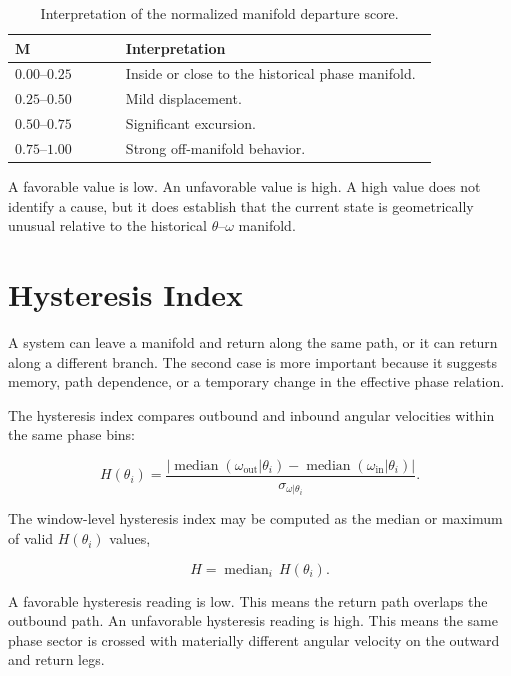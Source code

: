 \documentclass[11pt]{article}
\begin{document}
\begin{table}[H]
\centering
\caption{Interpretation of the normalized manifold departure score.}
\begin{tabular}{>{\raggedleft\arraybackslash}p{0.22\linewidth} p{0.62\linewidth}}
\toprule
\(\boldsymbol{M}\) & Interpretation \\
\midrule
\(0.00\)--\(0.25\) & Inside or close to the historical phase manifold. \\
\(0.25\)--\(0.50\) & Mild displacement. \\
\(0.50\)--\(0.75\) & Significant excursion. \\
\(0.75\)--\(1.00\) & Strong off-manifold behavior. \\
\bottomrule
\end{tabular}
\end{table}

A favorable value is low. An unfavorable value is high. A high value does not identify a cause, but it does establish that the current state is geometrically unusual relative to the historical \(\theta\)--\(\omega\) manifold.

\section{Hysteresis Index}

A system can leave a manifold and return along the same path, or it can return along a different branch. The second case is more important because it suggests memory, path dependence, or a temporary change in the effective phase relation.

The hysteresis index compares outbound and inbound angular velocities within the same phase bins:

\begin{equation}
H(\theta_i) =
\frac{\left|\operatorname{median}(\omega_{\mathrm{out}}|\theta_i)-
\operatorname{median}(\omega_{\mathrm{in}}|\theta_i)\right|}
{\sigma_{\omega|\theta_i}}.
\end{equation}

The window-level hysteresis index may be computed as the median or maximum of valid \(H(\theta_i)\) values,

\begin{equation}
H = \operatorname{median}_{i}\,H(\theta_i).
\end{equation}

A favorable hysteresis reading is low. This means the return path overlaps the outbound path. An unfavorable hysteresis reading is high. This means the same phase sector is crossed with materially different angular velocity on the outward and return legs.
\end{document}
